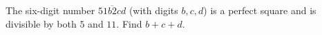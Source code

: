 The six-digit number $\overline{51b2cd}$ (with digits $b,c,d$) is a perfect square and is divisible by both $5$ and $11$. Find $b+c+d$.

